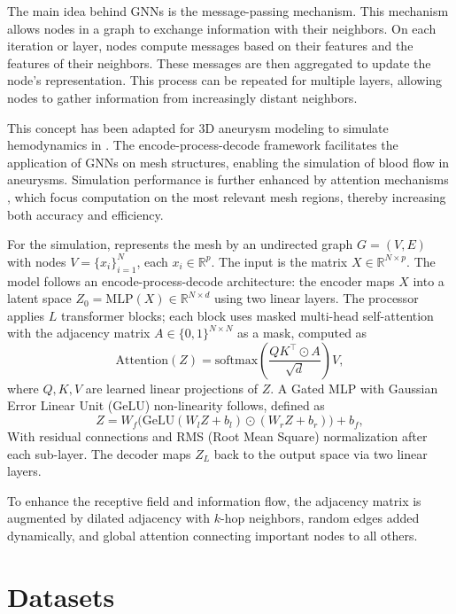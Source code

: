 \documentclass[%
 reprint,
 amsmath,amssymb,
 aps,
 floatfix,
 nofootinbib,
]{revtex4-2}
\begin{document}
The main idea behind GNNs is the message-passing mechanism. This mechanism allows nodes in a graph to exchange information with their neighbors. On each iteration or layer, nodes compute messages based on their features and the features of their neighbors. These messages are then aggregated to update the node's representation. This process can be repeated for multiple layers, allowing nodes to gather information from increasingly distant neighbors.

This concept has been adapted for 3D aneurysm modeling to simulate hemodynamics in \citep{graphphysics}. The encode-process-decode framework facilitates the application of GNNs on mesh structures, enabling the simulation of blood flow in aneurysms. Simulation performance is further enhanced by attention mechanisms \citep{VaswaniSPUJGKP17}, which focus computation on the most relevant mesh regions, thereby increasing both accuracy and efficiency.

For the simulation, \citep{graphphysics} represents the mesh by an undirected graph \( G = (V, E) \) with nodes \( V = \{x_i\}_{i=1}^N \), each \( x_i \in \mathbb{R}^p \). The input is the matrix \( X \in \mathbb{R}^{N \times p} \). The model follows an encode-process-decode architecture: the encoder maps \( X \) into a latent space \( Z_0 = \text{MLP}(X) \in \mathbb{R}^{N \times d} \) using two linear layers. The processor applies \( L \) transformer blocks; each block uses masked multi-head self-attention with the adjacency matrix \( A \in \{0,1\}^{N \times N} \) as a mask, computed as
\[
\text{Attention}(Z) = \text{softmax}\left(\frac{QK^\top \odot A}{\sqrt{d}}\right)V,
\]
where \( Q, K, V \) are learned linear projections of \( Z \). A Gated MLP with Gaussian Error Linear Unit (GeLU) \citep{hendrycks2023gaussianerrorlinearunits} non-linearity follows, defined as
\[
Z = W_f \big( \text{GeLU}(W_l Z + b_l) \odot (W_r Z + b_r) \big) + b_f,
\]
With residual connections and RMS (Root Mean Square)  normalization \citep{zhang2019rootmeansquarelayer} after each sub-layer. The decoder maps \( Z_L \) back to the output space via two linear layers.

To enhance the receptive field and information flow, the adjacency matrix is augmented by dilated adjacency with \( k \)-hop neighbors, random edges added dynamically, and global attention connecting important nodes to all others.


\section{Datasets} \label{DATASET}
\end{document}
